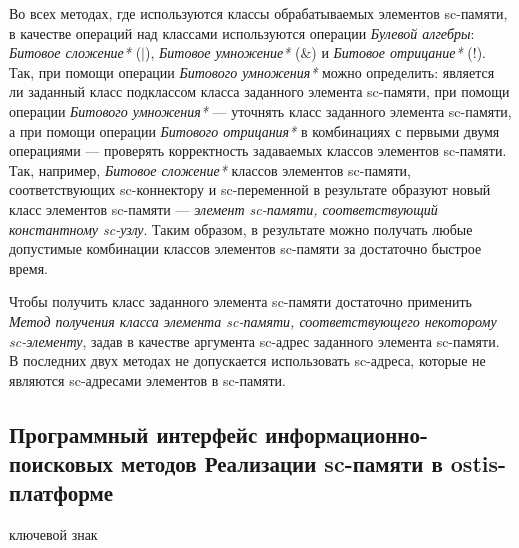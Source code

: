 Во всех методах, где используются классы обрабатываемых элементов sc-памяти, в качестве операций над классами используются операции \textit{Булевой алгебры}: \textit{Битовое сложение*} ($|$), \textit{Битовое умножение*} ($\&$) и \textit{Битовое отрицание*} ($!$). Так, при помощи операции \textit{Битового умножения*} можно определить: является ли заданный класс подклассом класса заданного элемента sc-памяти, при помощи операции \textit{Битового умножения*} --- уточнять класс заданного элемента sc-памяти, а при помощи операции \textit{Битового отрицания*} в комбинациях с первыми двумя операциями --- проверять корректность задаваемых классов элементов sc-памяти. Так, например, \textit{Битовое сложение*} классов элементов sc-памяти, соответствующих sc-коннектору и sc-переменной в результате образуют новый класс элементов sc-памяти --- \textit{элемент sc-памяти, соответствующий константному sc-узлу}. Таким образом, в результате можно получать любые допустимые комбинации классов элементов sc-памяти за достаточно быстрое время.

Чтобы получить класс заданного элемента sc-памяти достаточно применить \textit{Метод получения класса элемента sc-памяти, соответствующего некоторому sc-элементу}, задав в качестве аргумента sc-адрес заданного элемента sc-памяти. В последних двух методах не допускается использовать sc-адреса, которые не являются sc-адресами элементов в sc-памяти.

\subsection{Программный интерфейс информационно-поисковых методов Реализации sc-памяти в ostis-платформе}
\label{sec_soft_platform_information_retrieval_subsystem}

\begin{SCn}
	
\begin{scnrelfromlist}{ключевой знак}
\end{scnrelfromlist}
	
\end{SCn}

